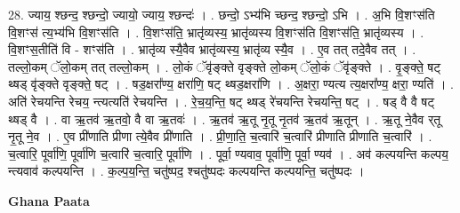 \documentclass[17pt]{extarticle}
\begin{document}
28. ज्याय॒ श्छन्द॒ श्छन्दो॒ ज्यायो॒ ज्याय॒ श्छन्दः॑ । . छन्दो॒ ऽभ्य॑भि च्छन्द॒ श्छन्दो॒ ऽभि । . अ॒भि वि॒शꣳस॑ति वि॒शꣳस॑ त्य॒भ्य॑भि वि॒शꣳस॑ति । . वि॒शꣳस॑ति॒ भ्रातृ॑व्यस्य॒ भ्रातृ॑व्यस्य वि॒शꣳस॑ति वि॒शꣳस॑ति॒ भ्रातृ॑व्यस्य । . वि॒शꣳस॒तीति॑ वि - शꣳस॑ति । . भ्रातृ॑व्य स्यै॒वैव भ्रातृ॑व्यस्य॒ भ्रातृ॑व्य स्यै॒व । . ए॒व तत् तदे॒वैव तत् । . तल्लो॒कम् ॅलो॒कम् तत् तल्लो॒कम् । . लो॒कं ॅवृ॑ङ्क्ते वृङ्क्ते लो॒कम् ॅलो॒कं ॅवृ॑ङ्क्ते । . वृ॒ङ्क्ते॒ षट् थ्षड् वृ॑ङ्क्ते वृङ्क्ते॒ षट् । . षड॒क्षरा᳚ण्य॒ क्षरा॑णि॒ षट् थ्षड॒क्षरा॑णि । . अ॒क्षरा॒ ण्यत्य त्य॒क्षरा᳚ण्य॒ क्षरा॒ ण्यति॑ । . अति॑ रेचयन्ति रेचय॒ न्त्यत्यति॑ रेचयन्ति । . रे॒च॒य॒न्ति॒ षट् थ्षड् रे॑चयन्ति रेचयन्ति॒ षट् । . षड् वै वै षट् थ्षड् वै । . वा ऋ॒तव॑ ऋ॒तवो॒ वै वा ऋ॒तवः॑ । . ऋ॒तव॑ ऋ॒तू नृ॒तू नृ॒तव॑ ऋ॒तव॑ ऋ॒तून् । . ऋ॒तू ने॒वैव र्‌तू नृ॒तू ने॒व । . ए॒व प्री॑णाति प्रीणा त्ये॒वैव प्री॑णाति । . प्री॒णा॒ति॒ च॒त्वारि॑ च॒त्वारि॑ प्रीणाति प्रीणाति च॒त्वारि॑ । . च॒त्वारि॒ पूर्वा॑णि॒ पूर्वा॑णि च॒त्वारि॑ च॒त्वारि॒ पूर्वा॑णि । . पूर्वा॒ ण्यवाव॒ पूर्वा॑णि॒ पूर्वा॒ ण्यव॑ । . अव॑ कल्पयन्ति कल्पय॒ न्त्यवाव॑ कल्पयन्ति । . क॒ल्प॒य॒न्ति॒ चतु॑ष्पद॒ श्चतु॑ष्पदः कल्पयन्ति कल्पयन्ति॒ चतु॑ष्पदः । \newline

\textbf{Ghana Paata } \newline
\end{document}
